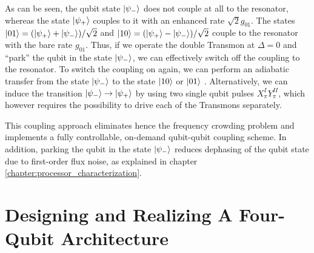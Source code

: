 %
As can be seen, the qubit state $\left| \psi_- \right>$ does not couple at all to the resonator, whereas the state $\left| \psi_+ \right>$ couples to it with an enhanced rate $\sqrt{2}g_{01}$. The states $\left| 01 \right>=(\left| \psi_+ \right>+\left| \psi_- \right>)/\sqrt{2}$ and $\left| 10 \right>=(\left| \psi_+ \right>-\left| \psi_- \right>)/\sqrt{2}$ couple to the resonator with the bare rate $g_{01}$. Thus, if we operate the double Transmon at $\Delta = 0$ and ``park'' the qubit in the state $\left| \psi_- \right>$, we can effectively switch off the coupling to the resonator. To switch the coupling on again, we can perform an adiabatic transfer from the state $\left| \psi_- \right>$ to the state $\left| 10 \right>$ or $\left| 01 \right>$ \citep{srinivasan_tunable_2011}. Alternatively, we can induce the transition $\left| \psi_- \right>\to\left| \psi_+ \right>$ by using two single qubit pulses $X^I_\pi Y^{II}_\pi$, which however requires the possibility to drive each of the Transmons separately.

\smallskip

This coupling approach eliminates hence the frequency crowding problem and implements a fully controllable, on-demand qubit-qubit coupling scheme. In addition, parking the qubit in the state $\left| \psi_- \right>$ reduces dephasing of the qubit state due to first-order flux noise, as explained in chapter \ref{chapter:processor_characterization}. 

%
%

\section{Designing and Realizing A Four-Qubit Architecture}

